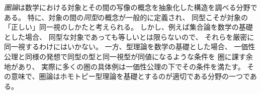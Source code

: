 \documentclass[index]{subfiles}
\begin{document}

\emph{圏論}は数学における対象とその間の写像の概念を抽象化した構造を調べる分野である。
特に、対象の間の\emph{同型}の概念が一般的に定義され、
同型こそが対象の「正しい」同一視のしかたと考えられる。
しかし、例えば集合論を数学の基礎とした場合、
同型な対象であっても等しいとは限らないので、
それらを厳密に同一視するわけにはいかない。
一方、型理論を数学の基礎とした場合、
一価性公理と同様の発想で同型の型と同一視型が同値になるような条件を
圏に課す余地があり、
実際に多くの圏の具体例は一価性公理の下でその条件を満たす。
その意味で、圏論はホモトピー型理論を基礎とするのが適切である分野の一つである。

\begin{mySubsections}
  
  
  
  
\end{mySubsections}
\end{document}
